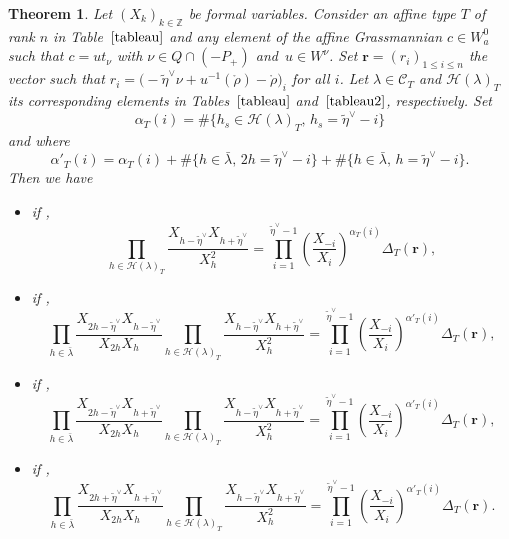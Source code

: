 \documentclass[pdftex]{sigma}
\newtheorem{Theorem}{Theorem}[section]
\numberwithin{equation}{section}
\newcommand{\cC}{\mathcal{C}}
\def\cch{\mathcal H}
\newcommand{\Z}{\mathbb{Z}}
\begin{document}
\begin{Theorem}\label{thm:enumhook}
Let $(X_k)_{k\in\Z}$ be formal variables.
Consider an affine type $T$ of rank $n$ in Table~$\ref{tableau}$ and any element of the affine Grassmannian $c\in W_{a}^{0}$ such that $c=ut_{\nu}$ with $\nu\in Q\cap(-P_{+})$ and~$u\in W^{\nu}$. Set $\mathbf{r}=(r_i)_{1\leq i\leq n}$ the vector such that $r_i=\bigl(-\tilde{\eta}^{\vee}\nu+u^{-1}(\mathring{\rho})-\mathring{\rho}\bigr)_i$ for all $i$. Let $\lambda\in\cC_T$ and $\cch(\lambda)_T$ its corresponding elements in Tables~$\ref{tableau}$ and~$\ref{tableau2}$, respectively. Set
\[
\alpha_{T}(i)=\#\bigl\lbrace h_s\in \cch(\lambda)_T , \, h_s=\tilde{\eta}^{\vee}-i\bigr\rbrace
\]
 and where
 \[
 \alpha'_{T}(i)=\alpha_T(i)+\#\bigl\lbrace h\in \bar{\lambda},\, 2h=\tilde{\eta}^{\vee}-i\bigr\rbrace+\#\bigl\lbrace h\in \bar{\lambda},\, h=\tilde{\eta}^{\vee}-i\bigr\rbrace.
\]
Then we have
\begin{itemize}\itemsep=0pt
\item if ,
\begin{equation}\label{eq:hookproductA}
\prod_{h\in\cch(\lambda)_T}\frac{X_{h-\tilde{\eta}^{\vee}}X_{h+\tilde{\eta}^{\vee}}}{X_h^2}=\prod_{i=1}^{\tilde{\eta}^{\vee}-1}\left(\frac{X_{-i}}{X_i}\right)^{\alpha_{T}(i)}\Delta_T(\mathbf{r}),
\end{equation}
\item if ,
\begin{equation*}
\prod_{h\in\bar{\lambda}}\frac{X_{2h-\tilde{\eta}^{\vee}}X_{h-\tilde{\eta}^{\vee}}}{X_{2h}X_h}
\prod_{h\in\cch(\lambda)_T}\frac{X_{h-\tilde{\eta}^{\vee}}X_{h+\tilde{\eta}^{\vee}}}{X_h^2}=\prod_{i=1}^{\tilde{\eta}^{\vee}-1}\left(\frac{X_{-i}}{X_i}\right)^{\alpha'_{T}(i)}\Delta_T(\mathbf{r}),
\end{equation*}
\item if ,
\begin{equation*}
\prod_{h\in\bar{\lambda}}\frac{X_{2h-\tilde{\eta}^{\vee}}X_{h+\tilde{\eta}^{\vee}}}{X_{2h}X_h}\prod_{h\in\cch(\lambda)_T}\frac{X_{h-\tilde{\eta}^{\vee}}X_{h+\tilde{\eta}^{\vee}}}{X_h^2}=\prod_{i=1}^{\tilde{\eta}^{\vee}-1}\left(\frac{X_{-i}}{X_i}\right)^{\alpha'_{T}(i)}\Delta_T(\mathbf{r}),
\end{equation*}
\item if ,
\begin{equation*}
\prod_{h\in\bar{\lambda}}\frac{X_{2h+\tilde{\eta}^{\vee}}X_{h+\tilde{\eta}^{\vee}}}{X_{2h}X_h}\prod_{h\in\cch(\lambda)_T} \frac{X_{h-\tilde{\eta}^{\vee}}X_{h+\tilde{\eta}^{\vee}}}{X_h^2}=\prod_{i=1}^{\tilde{\eta}^{\vee}-1} \left(\frac{X_{-i}}{X_i}\right)^{\alpha'_{T}(i)}\Delta_T(\mathbf{r}).
\end{equation*}
\end{itemize}
\end{Theorem}
\end{document}

